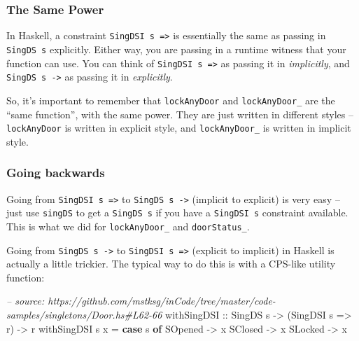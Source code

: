 \documentclass[]{article}
\newenvironment{Shaded}{}{}
\newcommand{\KeywordTok}[1]{\textcolor[rgb]{0.00,0.44,0.13}{\textbf{#1}}}
\newcommand{\DataTypeTok}[1]{\textcolor[rgb]{0.56,0.13,0.00}{#1}}
\newcommand{\CommentTok}[1]{\textcolor[rgb]{0.38,0.63,0.69}{\textit{#1}}}
\newcommand{\OtherTok}[1]{\textcolor[rgb]{0.00,0.44,0.13}{#1}}
\newcommand{\FunctionTok}[1]{\textcolor[rgb]{0.02,0.16,0.49}{#1}}
\newcommand{\NormalTok}[1]{#1}
\begin{document}
\subsubsection{The Same Power}\label{the-same-power}

In Haskell, a constraint \texttt{SingDSI\ s\ =\textgreater{}} is essentially the
same as passing in \texttt{SingDS\ s} explicitly. Either way, you are passing in
a runtime witness that your function can use. You can think of
\texttt{SingDSI\ s\ =\textgreater{}} as passing it in \emph{implicitly}, and
\texttt{SingDS\ s\ -\textgreater{}} as passing it in \emph{explicitly}.

So, it's important to remember that \texttt{lockAnyDoor} and
\texttt{lockAnyDoor\_} are the ``same function'', with the same power. They are
just written in different styles -- \texttt{lockAnyDoor} is written in explicit
style, and \texttt{lockAnyDoor\_} is written in implicit style.

\subsubsection{Going backwards}\label{going-backwards}

Going from \texttt{SingDSI\ s\ =\textgreater{}} to
\texttt{SingDS\ s\ -\textgreater{}} (implicit to explicit) is very easy -- just
use \texttt{singDS} to get a \texttt{SingDS\ s} if you have a
\texttt{SingDSI\ s} constraint available. This is what we did for
\texttt{lockAnyDoor\_} and \texttt{doorStatus\_}.

Going from \texttt{SingDS\ s\ -\textgreater{}} to
\texttt{SingDSI\ s\ =\textgreater{}} (explicit to implicit) in Haskell is
actually a little trickier. The typical way to do this is with a CPS-like
utility function:

\begin{Shaded}
\begin{Highlighting}[]
\CommentTok{-- source: https://github.com/mstksg/inCode/tree/master/code-samples/singletons/Door.hs#L62-66}
\OtherTok{withSingDSI ::} \DataTypeTok{SingDS}\NormalTok{ s }\OtherTok{->}\NormalTok{ (}\DataTypeTok{SingDSI}\NormalTok{ s }\OtherTok{=>}\NormalTok{ r) }\OtherTok{->}\NormalTok{ r}
\NormalTok{withSingDSI s x }\FunctionTok{=} \KeywordTok{case}\NormalTok{ s }\KeywordTok{of}
    \DataTypeTok{SOpened} \OtherTok{->}\NormalTok{ x}
    \DataTypeTok{SClosed} \OtherTok{->}\NormalTok{ x}
    \DataTypeTok{SLocked} \OtherTok{->}\NormalTok{ x}
\end{Highlighting}
\end{Shaded}
\end{document}
